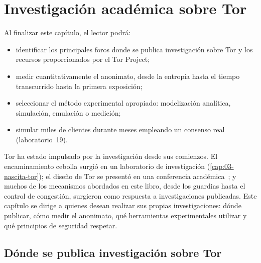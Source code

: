 \chapter{Investigación académica sobre Tor}\label{cap:29-ricerca}

\begin{obiettivi}
Al finalizar este capítulo, el lector podrá:
\begin{itemize}[nosep]
  \item identificar los principales foros donde se publica investigación sobre Tor y los recursos proporcionados por el Tor Project;
  \item medir cuantitativamente el anonimato, desde la entropía hasta el tiempo transcurrido hasta la primera exposición;
  \item seleccionar el método experimental apropiado: modelización analítica, simulación, emulación o medición;
  \item simular miles de clientes durante meses empleando un consenso real (laboratorio~19).
\end{itemize}
\end{obiettivi}

Tor ha estado impulsado por la investigación desde sus comienzos. El encaminamiento cebolla surgió en un laboratorio de investigación (\cref{cap:03-nascita-tor}); el diseño de Tor se presentó en una conferencia académica~\cite{dingledine2004tor}; y muchos de los mecanismos abordados en este libro, desde los guardias hasta el control de congestión, surgieron como respuesta a investigaciones publicadas. Este capítulo se dirige a quienes desean realizar sus propias investigaciones: dónde publicar, cómo medir el anonimato, qué herramientas experimentales utilizar y qué principios de seguridad respetar.

\section{Dónde se publica investigación sobre Tor}\label{sec:ric-dove}

